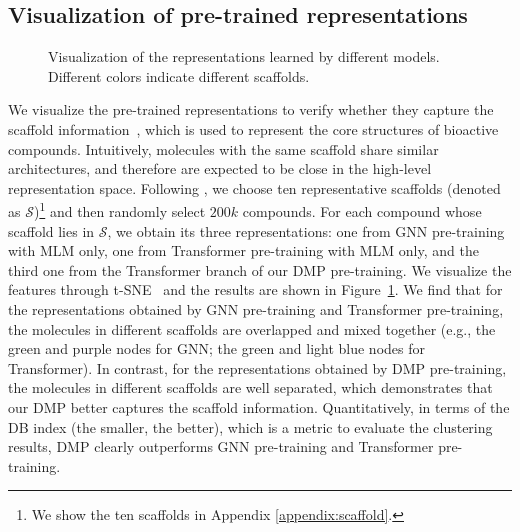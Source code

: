 \documentclass{article}
\newcommand{\ourM}{DMP}
\begin{document}
\subsection{Visualization of pre-trained representations}
\begin{figure}[!htpb]
\centering
\begin{minipage}{0.33\linewidth}
\end{minipage}\begin{minipage}{0.33\linewidth}
\end{minipage}\begin{minipage}{0.33\linewidth}
\subfigure[\ourM{}: DB Index 2.19]{
\texttt{[image: db\_dmp.pdf]}
}
\end{minipage}
\caption{Visualization of the representations learned by different models. Different colors indicate different scaffolds.}
\label{fig:viz_different_models_by_scaffold}
\end{figure}
We visualize the pre-trained representations to verify whether they capture the scaffold information~\cite{hu2016scaffold}, which is used to represent the core structures of bioactive compounds. Intuitively, molecules with the same scaffold share similar architectures, and therefore are expected to be close in the high-level representation space. Following \cite{li2020learn}, we choose ten representative scaffolds (denoted as $\mathcal{S}$)\footnote{We show the ten scaffolds in Appendix \ref{appendix:scaffold}. } and then randomly select $200k$ compounds.
For each compound whose scaffold lies in $\mathcal{S}$, we obtain its three representations: one from GNN pre-training with MLM only, one from Transformer pre-training with MLM only, and the third one from the  Transformer branch of our \ourM{} pre-training. We visualize the features through t-SNE~\cite{van2008visualizing} and the results are shown in Figure~\ref{fig:viz_different_models_by_scaffold}. We find that for the representations obtained by GNN pre-training and Transformer pre-training,   the molecules in different scaffolds  are overlapped and mixed together (e.g., the green and purple nodes for GNN; the green and light blue nodes for Transformer). In contrast, for the representations obtained by \ourM{} pre-training, the molecules in different scaffolds are well separated, which demonstrates that our \ourM{} better captures the scaffold information. Quantitatively, in terms of the DB index \citep{davies1979cluster} (the smaller, the better), which is a metric to evaluate the clustering results, \ourM{} clearly outperforms GNN pre-training and Transformer pre-training.
\end{document}
